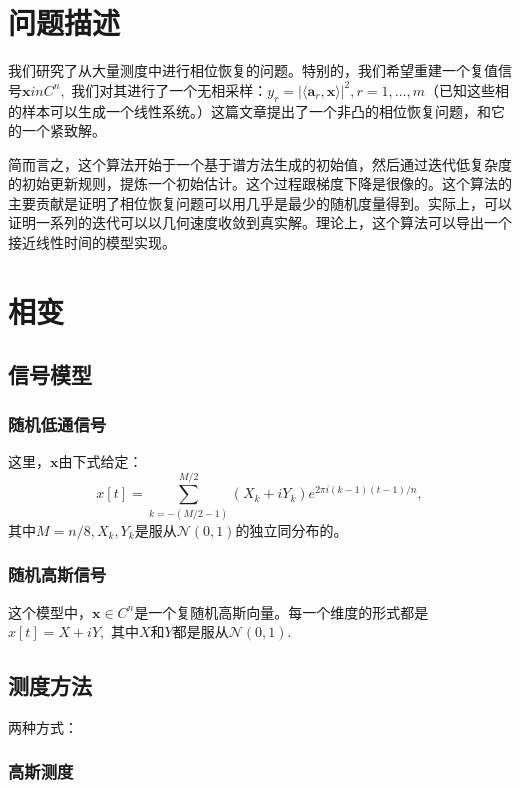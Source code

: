 \documentclass[12pt,letterpaper]{article}
\begin{document}
\section*{问题描述}

我们研究了从大量测度中进行相位恢复的问题。特别的，我们希望重建一个复值信号$\mathbf{x}in C^n,$ 我们对其进行了一个无相采样：$y_r = |\langle \mathbf{a}_r,\mathbf{x}\rangle|^2, r = 1,\dots,m$（已知这些相的样本可以生成一个线性系统。）这篇文章提出了一个非凸的相位恢复问题，和它的一个紧致解。

简而言之，这个算法开始于一个基于谱方法生成的初始值，然后通过迭代低复杂度的初始更新规则，提炼一个初始估计。这个过程跟梯度下降是很像的。这个算法的主要贡献是证明了相位恢复问题可以用几乎是最少的随机度量得到。实际上，可以证明一系列的迭代可以以几何速度收敛到真实解。理论上，这个算法可以导出一个接近线性时间的模型实现。

\section*{相变}

\subsection*{信号模型}

\subsubsection*{随机低通信号}

这里，$\mathbf{x}$由下式给定：
$$x[t]=\sum_{k=-(M/2-1)}^{M/2} (X_k+iY_k) e^{2\pi i(k-1)(t-1)/n},$$
其中$M = n/8, X_k,Y_k$是服从$\mathcal{N}(0,1)$的独立同分布的。

\subsubsection*{随机高斯信号}

这个模型中，$\mathbf{x} \in C^n$是一个复随机高斯向量。每一个维度的形式都是$x[t] = X+iY,$ 其中$X$和$Y$都是服从$\mathcal{N}(0,1).$

\subsection*{测度方法}

两种方式：

\subsubsection*{高斯测度}
\end{document}

